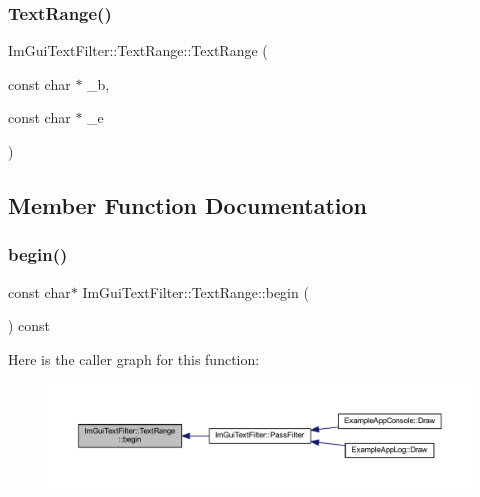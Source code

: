 \subsubsection{\texorpdfstring{Text\+Range()}{TextRange()}\hspace{0.1cm}{\footnotesize\ttfamily [2/2]}}
{\footnotesize\ttfamily Im\+Gui\+Text\+Filter\+::\+Text\+Range\+::\+Text\+Range (\begin{DoxyParamCaption}\item[{const char $\ast$}]{\+\_\+b,  }\item[{const char $\ast$}]{\+\_\+e }\end{DoxyParamCaption})\hspace{0.3cm}{\ttfamily [inline]}}



\subsection{Member Function Documentation}
\mbox{\label{struct_im_gui_text_filter_1_1_text_range_ab6b04c316f081e8ad7b044a8afbda63c}} 
\subsubsection{\texorpdfstring{begin()}{begin()}}
{\footnotesize\ttfamily const char$\ast$ Im\+Gui\+Text\+Filter\+::\+Text\+Range\+::begin (\begin{DoxyParamCaption}{ }\end{DoxyParamCaption}) const\hspace{0.3cm}{\ttfamily [inline]}}

Here is the caller graph for this function\+:
\nopagebreak
\begin{figure}[H]
\begin{center}
\leavevmode
\includegraphics[width=350pt]{struct_im_gui_text_filter_1_1_text_range_ab6b04c316f081e8ad7b044a8afbda63c_icgraph}
\end{center}
\end{figure}
\mbox{\label{struct_im_gui_text_filter_1_1_text_range_ab8d74e3b0ce63997746828e4b8ae3bbf}} 
